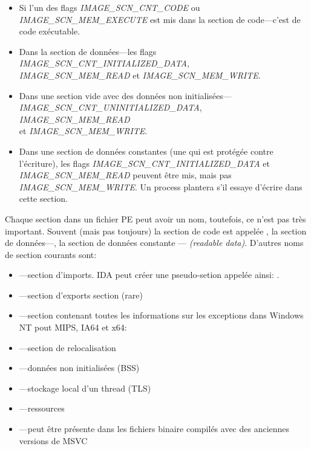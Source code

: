 \begin{itemize}
\item Si l'un des flags \emph{IMAGE\_SCN\_CNT\_CODE} ou \emph{IMAGE\_SCN\_MEM\_EXECUTE}
est mis dans la section de code---c'est de code exécutable.

\item Dans la section de données---les flags \emph{IMAGE\_SCN\_CNT\_INITIALIZED\_DATA},\\
\emph{IMAGE\_SCN\_MEM\_READ} et \emph{IMAGE\_SCN\_MEM\_WRITE}.

\item Dans une section vide avec des données non initialisées---\\
\emph{IMAGE\_SCN\_CNT\_UNINITIALIZED\_DATA}, \emph{IMAGE\_SCN\_MEM\_READ} \\
et \emph{IMAGE\_SCN\_MEM\_WRITE}.

\item Dans une section de données constantes (une qui est protégée contre l'écriture),
les flags \emph{IMAGE\_SCN\_CNT\_INITIALIZED\_DATA} et \emph{IMAGE\_SCN\_MEM\_READ} peuvent
être mis, mais pas \emph{IMAGE\_SCN\_MEM\_WRITE}.
Un process plantera s'il essaye d'écrire dans cette section.
\end{itemize}

Chaque section dans un fichier PE peut avoir un nom, toutefois, ce n'est pas très
important.
Souvent (mais pas toujours) la section de code est appelée , la section
de données---, la section de données constante ---  \emph{(readable data)}.
D'autres noms de section courants sont:

\begin{itemize}
\item {}---section d'imports.
\ac{IDA} peut créer une pseudo-setion appelée ainsi: .
\item {}---section d'exports section (rare)
\item {}---section contenant toutes les informations sur les exceptions
dans Windows NT pout MIPS, \ac{IA64} et x64: 
\item {}---section de relocalisation
\item {}---données non initialisées (\ac{BSS})
\item {}---stockage local d'un thread (\ac{TLS})
\item {}---ressources
\item {}---peut être présente dans les fichiers binaire compilés avec des
anciennes versions de MSVC
\end{itemize}

